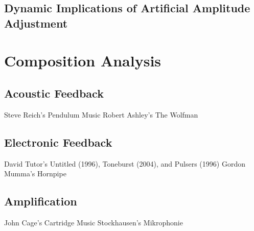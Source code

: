 \documentclass[titlepage]{scrartcl}
\begin{document}
        \subsection{Dynamic Implications of Artificial Amplitude Adjustment}

    \section{Composition Analysis}
        \subsection{Acoustic Feedback}
            Steve Reich's Pendulum Music
            Robert Ashley's The Wolfman

        \subsection{Electronic Feedback}
            David Tutor's Untitled (1996), Toneburst (2004), and Pulsers (1996)
            Gordon Mumma's Hornpipe

        \subsection{Amplification}
            John Cage's Cartridge Music
            Stockhausen's Mikrophonie

    \printbibliography
\end{document}
